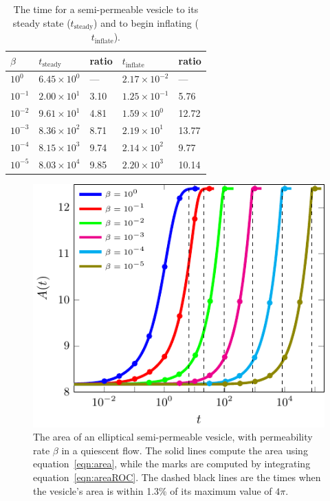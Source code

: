 \documentclass[9pt,twocolumn,twoside,lineno]{pnas-new}
\newif\ifTikz
\begin{document}
\begin{table}[htp]
  \centering
  \caption{\label{tbl:ellipseRelaxTimes} The time for a semi-permeable
  vesicle to its steady state ($t_\mathrm{steady}$) and to begin
  inflating ($t_\mathrm{inflate}$).}
  \begin{tabular}{C{0.8cm}C{2cm}C{0.8cm}C{2cm}C{0.8cm}}
    $\beta$ & $t_\mathrm{steady}$ & ratio & $t_\mathrm{inflate}$ & ratio \\
    \midrule
    $10^{0}$  & $6.45 \times 10^{0}$ & ---  
              & $2.17 \times 10^{-2}$ & --- \\ 
    $10^{-1}$ & $2.00 \times 10^{1}$ & 3.10 & 
                $1.25 \times 10^{-1}$ & 5.76 \\
    $10^{-2}$ & $9.61 \times 10^{1}$ & 4.81 & 
                $1.59 \times 10^{0}$ & 12.72 \\
    $10^{-3}$ & $8.36 \times 10^{2}$ & 8.71 & 
                $2.19 \times 10^{1}$ & 13.77 \\
    $10^{-4}$ & $8.15 \times 10^{3}$ & 9.74 & 
                $2.14 \times 10^{2}$ & 9.77 \\
    $10^{-5}$ & $8.03 \times 10^{4}$ & 9.85 & 
                $2.20 \times 10^{3}$ & 10.14 \\
    \bottomrule
  \end{tabular}
\end{table}


\begin{figure}[htp]
  \centering
%  
  \includegraphics[width=0.8\linewidth]{figures/ellipseArea}
  \caption{\label{fig:ellipseArea} The area of an elliptical
  semi-permeable vesicle, with permeability rate $\beta$ in a quiescent
  flow. The solid lines compute the area using
  equation~\eqref{eqn:area}, while the marks are computed by integrating
  equation~\eqref{eqn:areaROC}. The dashed black lines are the times
  when the vesicle's area is within 1.3\% of its maximum value of
  $4\pi$.}
\end{figure}
\end{document}
